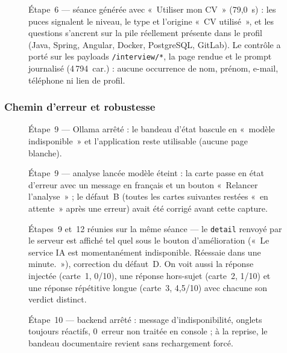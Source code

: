 \begin{figure}[H]\centering{}
\caption{Étape~6 --- séance générée avec «~Utiliser mon CV~» (79,0~s) : les
puces signalent le niveau, le type et l'origine «~CV utilisé~», et les questions
s'ancrent sur la pile réellement présente dans le profil (Java, Spring, Angular,
Docker, PostgreSQL, GitLab). Le contrôle a porté sur les payloads
\texttt{/interview/*}, la page rendue et le prompt journalisé (4\,794~car.) :
aucune occurrence de nom, prénom, e-mail, téléphone ni lien de profil.}
\end{figure}

\subsubsection{Chemin d'erreur et robustesse}

\begin{figure}[H]\centering{}
\caption{Étape~9 --- Ollama arrêté : le bandeau d'état bascule en «~modèle
indisponible~» et l'application reste utilisable (aucune page blanche).}
\end{figure}

\begin{figure}[H]\centering{}
\caption{Étape~9 --- analyse lancée modèle éteint : la carte passe en état
d'erreur avec un message en français et un bouton «~Relancer l'analyse~» ; le
défaut~B (toutes les cartes suivantes restées «~en attente~» après une erreur)
avait été corrigé avant cette capture.}
\end{figure}

\begin{figure}[H]\centering{}
\caption{Étapes~9 et~12 réunies sur la même séance --- le \texttt{detail} renvoyé
par le serveur est affiché tel quel sous le bouton d'amélioration («~Le service
IA est momentanément indisponible. Réessaie dans une minute.~»), correction du
défaut~D. On voit aussi la réponse injectée (carte~1, 0/10), une réponse
hors-sujet (carte~2, 1/10) et une réponse répétitive longue (carte~3, 4,5/10)
avec chacune son verdict distinct.}
\end{figure}

\begin{figure}[H]\centering{}
\caption{Étape~10 --- backend arrêté : message d'indisponibilité, onglets
toujours réactifs, 0~erreur non traitée en console ; à la reprise, le bandeau
documentaire revient sans rechargement forcé.}
\end{figure}

